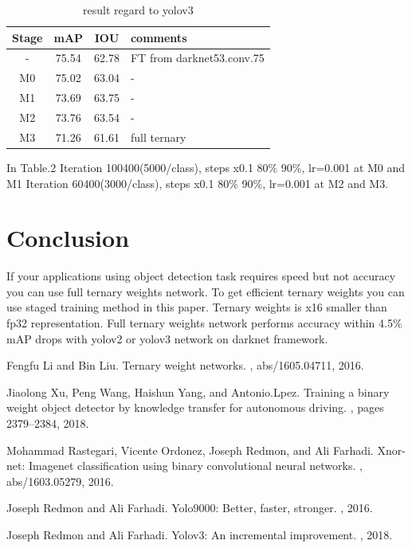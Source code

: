\documentclass[10pt,a4paper,twocolumn]{article}
\begin{document}
\begin{table}[htbp]
 \centering
 \begin{tabular}{c|c|c|l}
  Stage & mAP & IOU & comments \\ \hline\hline
  -        & 75.54 & 62.78 & FT from darknet53.conv.75 \\ \hline
  M0       & 75.02 & 63.04 & -                \\ \hline
  M1       & 73.69 & 63.75 & -                \\ \hline
  M2       & 73.76 & 63.54 & -                \\ \hline
  M3       & 71.26 & 61.61 & full ternary     \\ \hline\hline
 \end{tabular}
 \caption{result regard to yolov3}
 \label{tb:yolov3}
\end{table}

In Table.2 Iteration 100400(5000/class), steps x0.1 80\% 90\%, lr=0.001 at M0 and M1
Iteration 60400(3000/class), steps x0.1 80\% 90\%, lr=0.001 at M2 and M3.

\section{Conclusion}

If your applications using object detection task requires speed but not accuracy you can use full ternary weights network.
To get efficient ternary weights you can use staged training method in this paper.
Ternary weights is x16 smaller than fp32 representation.
Full ternary weights network performs accuracy within 4.5\% mAP drops with yolov2 or yolov3 network on darknet framework.

\begin{thebibliography}{1}

Fengfu Li and Bin Liu.
\newblock Ternary weight networks.
, abs/1605.04711, 2016.

Jiaolong Xu, Peng Wang, Haishun Yang, and Antonio.Lpez.
\newblock Training a binary weight object detector by knowledge transfer for
  autonomous driving.
, pages 2379--2384, 2018.

Mohammad Rastegari, Vicente Ordonez, Joseph Redmon, and Ali Farhadi.
\newblock Xnor-net: Imagenet classification using binary convolutional neural
  networks.
, abs/1603.05279, 2016.

Joseph Redmon and Ali Farhadi.
\newblock Yolo9000: Better, faster, stronger.
, 2016.

Joseph Redmon and Ali Farhadi.
\newblock Yolov3: An incremental improvement.
, 2018.

\end{thebibliography}
\end{document}

